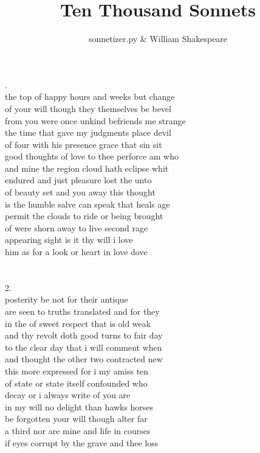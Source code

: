 \documentclass[10pt]{article}
\title{Ten Thousand Sonnets}
\author{sonnetizer.py \& William Shakespeare}
\date{}
\begin{document}
\maketitle

.\\
the top of happy hours and weeks but change\\
of your will though they themselves be bevel\\
from you were once unkind befriends me strange\\
the time that gave my judgments place devil\\
of four with his presence grace that sin sit\\
good thoughts of love to thee perforce am who\\
and mine the region cloud hath eclipse whit\\
endured and just pleasure lost the unto\\
of beauty set and you away this thought\\
is the humble salve can speak that heals age\\
permit the clouds to ride or being brought\\
of were shorn away to live second rage\\
appearing sight is it thy will i love\\
him as for a look or heart in love dove\\
\\
\\
2.\\
posterity be not for their antique\\
are seen to truths translated and for they\\
in the of sweet respect that is old weak\\
and thy revolt doth good turns to fair day\\
to the clear day that i will comment when\\
and thought the other two contracted new\\
this more expressed for i my amiss ten\\
of state or state itself confounded who\\
decay or i always write of you are\\
in my will no delight than hawks horses\\
be forgotten your will though alter far\\
a third nor are mine and life in courses\\
if eyes corrupt by the grave and thee loss\\
\end{document}
